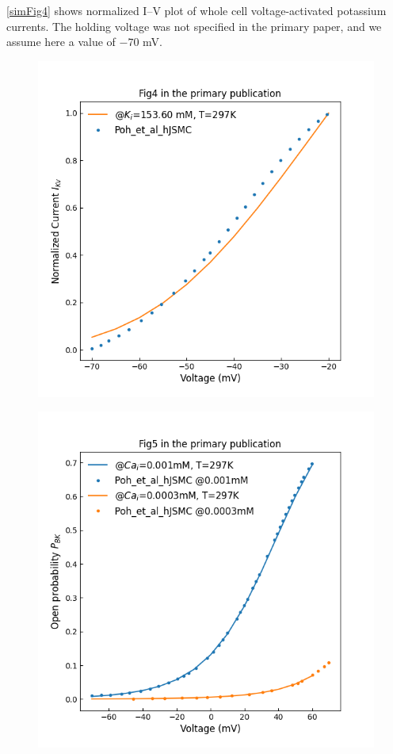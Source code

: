 \documentclass[fleqn,10pt]{physiome}
\begin{document}
\autoref{simFig4} shows normalized I–V plot of whole cell voltage-activated potassium currents. The holding voltage was not specified in the primary paper, and we assume here a value of $-70$ mV.

\begin{figure}
\centering
\begin{minipage}{.5\textwidth}
  \centering
  \includegraphics[width=\linewidth]{./figs/simFig4.png}
  \label{simFig4}
\end{minipage}%
\begin{minipage}{.5\textwidth}
  \centering
  \includegraphics[width=\linewidth]{./figs/simFig5.png}

\end{minipage}
\end{figure}
\end{document}

